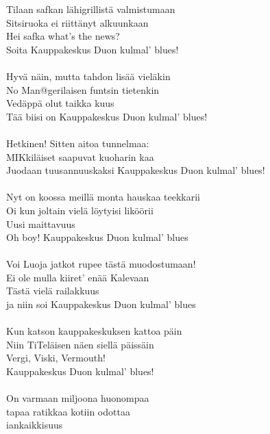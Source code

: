 Tilaan safkan lähigrillistä valmistumaan \\
Sitsiruoka ei riittänyt alkuunkaan \\
Hei safka what's the news? \\
Soita Kauppakeskus Duon kulmal' blues! \\
\hspace{10mm} \\
Hyvä näin, mutta tahdon lisää vieläkin \\
No Man@gerilaisen funtsin tietenkin \\
Vedäppä olut taikka kuus \\
Tää biisi on Kauppakeskus Duon kulmal' blues! \\
\hspace{10mm} \\
Hetkinen! Sitten aitoa tunnelmaa: \\
MIKkiläiset saapuvat kuoharin kaa \\
Juodaan tuusannuuskaksi Kauppakeskus Duon kulmal' blues! \\
\hspace{10mm} \\
Nyt on koossa meillä monta hauskaa teekkarii \\
Oi kun joltain vielä löytyisi liköörii \\
Uusi maittavuus \\
Oh boy! Kauppakeskus Duon kulmal' blues \\
\hspace{10mm} \\
Voi Luoja jatkot rupee tästä muodostumaan! \\
Ei ole mulla kiiret' enää Kalevaan \\
Tästä vielä railakkuus \\
ja niin soi Kauppakeskus Duon kulmal' blues \\
\hspace{10mm} \\
Kun katson kauppakeskuksen kattoa päin \\
Niin TiTeläisen näen siellä päissäin \\
Vergi, Viski, Vermouth! \\
Kauppakeskus Duon kulmal' blues! \\
\hspace{10mm} \\
On varmaan miljoona huonompaa \\
tapaa ratikkaa kotiin odottaa \\
iankaikkisuus \\
